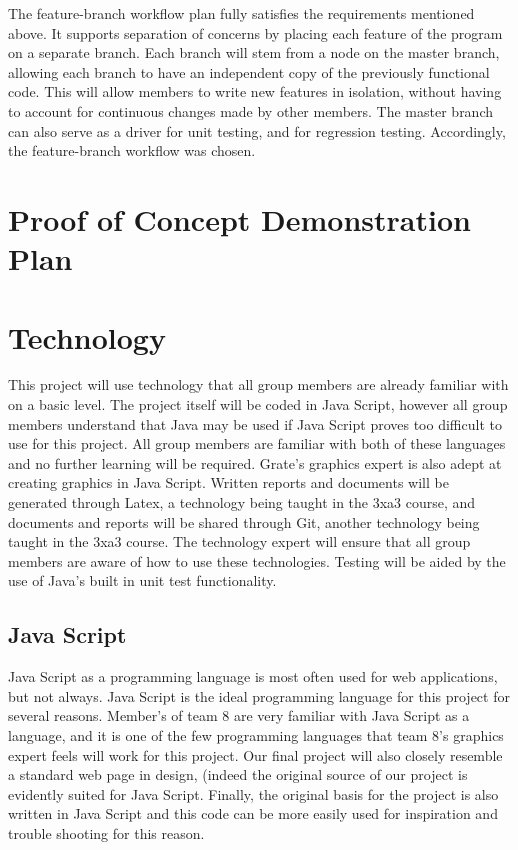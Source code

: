 \documentclass{article}
\begin{document}
The feature-branch workflow plan fully satisfies the requirements mentioned 
above. It supports separation of concerns by placing each feature of the program 
on a separate branch. Each branch will stem from a node on the master branch, 
allowing each branch to have an independent copy of the previously functional 
code. This will allow members to write new features in isolation, without having 
to account for continuous changes made by other members. The master branch can 
also serve as a driver for unit testing, and for regression testing. 
Accordingly, the feature-branch workflow was chosen.

\section{Proof of Concept Demonstration Plan}

\section{Technology}

This project will use technology that all group members are already familiar 
with on a basic level. The project itself will be coded in Java Script, however 
all group members understand that Java may be used if Java Script proves too 
difficult to use for this project. All group members are familiar with both of 
these languages and no further learning will be required. Grate’s graphics 
expert is also adept at creating graphics in Java Script. Written reports and 
documents will be generated through Latex, a technology being taught in the 3xa3 
course, and documents and reports will be shared through Git, another technology 
being taught in the 3xa3 course. The technology expert will ensure that all 
group members are aware of how to use these technologies. Testing will be aided 
by the use of Java’s built in unit test functionality.

\subsection{Java Script}

Java Script as a programming language is most often used for web applications, but not always. Java Script is the ideal programming language for this project for several reasons. Member's of team 8 are very familiar with Java Script as a language, and it is one of the few programming languages that team 8's graphics expert feels will work for this project. Our final project will also closely resemble a standard web page in design, (indeed the original source of our project is evidently suited for Java Script. Finally, the original basis for the project is also written in Java Script and this code can be more easily used for inspiration and trouble shooting for this reason.
\end{document}
